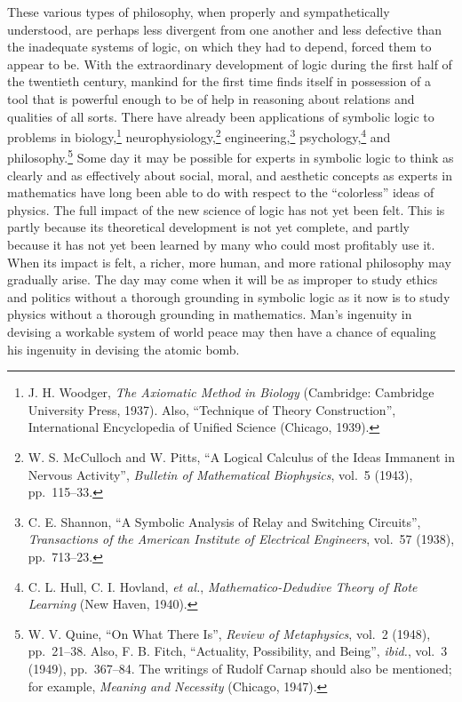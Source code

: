 \documentclass{book}
\begin{document}
These various types of philosophy, when properly and sympathetically understood, are perhaps less divergent from one another and less defective than the inadequate systems of logic, on which they had to depend, forced them to appear to be.  With the extraordinary development of logic during the first half of the twentieth century, mankind for the first time finds itself in possession of a tool that is powerful enough to be of help in reasoning about relations and qualities of all sorts.  There have already been applications of symbolic logic to problems in biology,\footnote{J. H. Woodger, \textit{The Axiomatic Method in Biology} (Cambridge: Cambridge University Press, 1937).  Also, “Technique of Theory Construction”, International Encyclopedia of Unified Science (Chicago, 1939).} neurophysiology,\footnote{W. S. McCulloch and W. Pitts, “A Logical Calculus of the Ideas Immanent in Nervous Activity”, \textit{Bulletin of Mathematical Biophysics}, vol.\ 5 (1943), pp.\ 115–33.} engineering,\footnote{C. E. Shannon, “A Symbolic Analysis of Relay and Switching Circuits”, \textit{Transactions of the American Institute of Electrical Engineers}, vol.\ 57 (1938), pp.\ 713–23.} psychology,\footnote{C. L. Hull, C. I. Hovland, \textit{et al.}, \textit{Mathematico-Dedudive Theory of Rote Learning} (New Haven, 1940).} and philosophy.\footnote{W. V. Quine, “On What There Is”, \textit{Review of Metaphysics}, vol.\ 2 (1948), pp.\ 21–38.  Also, F. B. Fitch, “Actuality, Possibility, and Being”, \textit{ibid.}, vol.\ 3 (1949), pp.\ 367–84.  The writings of Rudolf Carnap should also be mentioned; for example, \textit{Meaning and Necessity} (Chicago, 1947).}  Some day it may be possible for experts in symbolic logic to think as clearly and as effectively about social, moral, and aesthetic concepts as experts in mathematics have long been able to do with respect to the “colorless” ideas of physics.  The full impact of the new science of logic has not yet been felt.  This is partly because its theoretical development is not yet complete, and partly because it has not yet been learned by many who could most profitably use it.  When its impact is felt, a richer, more human, and more rational philosophy may gradually arise.  The day may come when it will be as improper to study ethics and politics without a thorough grounding in symbolic logic as it now is to study physics without a thorough grounding in mathematics.  Man's ingenuity in devising a workable system of world peace may then have a chance of equaling his ingenuity in devising the atomic bomb.
\end{document}
